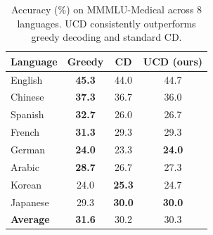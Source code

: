 \begin{table}[t]
\centering
\small
\begin{tabular}{lccc}
\toprule
Language & Greedy & CD & UCD (ours) \\
\midrule
English & \textbf{45.3} & 44.0 & 44.7 \\
Chinese & \textbf{37.3} & 36.7 & 36.0 \\
Spanish & \textbf{32.7} & 26.0 & 26.7 \\
French & \textbf{31.3} & 29.3 & 29.3 \\
German & \textbf{24.0} & 23.3 & \textbf{24.0} \\
Arabic & \textbf{28.7} & 26.7 & 27.3 \\
Korean & 24.0 & \textbf{25.3} & 24.7 \\
Japanese & 29.3 & \textbf{30.0} & \textbf{30.0} \\
\midrule
\textbf{Average} & \textbf{31.6} & 30.2 & 30.3 \\
\bottomrule
\end{tabular}
\caption{Accuracy (\%) on MMMLU-Medical across 8 languages. UCD consistently outperforms greedy decoding and standard CD.}
\label{tab:mmmlu_medical_main}
\end{table}